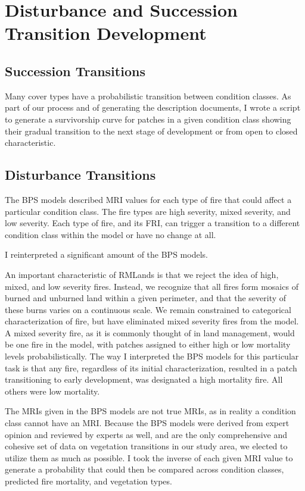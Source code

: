 \chapter{Disturbance and Succession Transition Development}

\section{Succession Transitions}
Many cover types have a probabilistic transition between condition classes. As part of our process and of generating the description documents, I wrote a script to generate a survivorship curve for patches in a given condition class showing their gradual transition to the next stage of development or from open to closed characteristic.

\section{Disturbance Transitions}
The BPS models described MRI values for each type of fire that could affect a particular condition class. The fire types are high severity, mixed severity, and low severity. Each type of fire, and its FRI, can trigger a transition to a different condition class within the model or have no change at all.

I reinterpreted a significant amount of the BPS models.

An important characteristic of RMLands is that we reject the idea of high, mixed, and low severity fires. Instead, we recognize that all fires form mosaics of burned and unburned land within a given perimeter, and that the severity of these burns varies on a continuous scale. We remain constrained to categorical characterization of fire, but have eliminated mixed severity fires from the model. A mixed severity fire, as it is commonly thought of in land management, would be one fire in the model, with patches assigned to either high or low mortality levels probabilistically. The way I interpreted the BPS models for this particular task is that any fire, regardless of its initial characterization, resulted in a patch transitioning to early development, was designated a high mortality fire. All others were low mortality.

The MRIs given in the BPS models are not true MRIs, as in reality a condition class cannot have an MRI. Because the BPS models were derived from expert opinion and reviewed by experts as well, and are the only comprehensive and cohesive set of data on vegetation transitions in our study area, we elected to utilize them as much as possible. I took the inverse of each given MRI value to generate a probability that could then be compared across condition classes, predicted fire mortality, and vegetation types.
